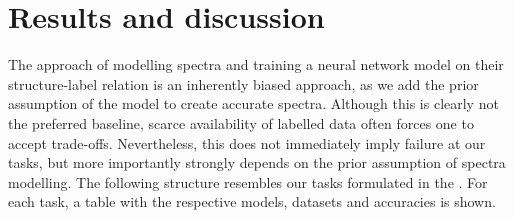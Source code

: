 

\chapter{Results and discussion} %
\label{Chapter4}
The approach of modelling spectra and training a neural network model on their structure-label relation is an inherently biased approach, as we add the prior assumption of the model to create accurate spectra. Although this is clearly not the preferred baseline, scarce availability of labelled data often forces one to accept trade-offs. Nevertheless, this does not immediately imply failure at our tasks, but more importantly strongly depends on the prior assumption of spectra modelling. The following structure resembles our tasks formulated in the . For each task, a table with the respective models, datasets and accuracies is shown.






